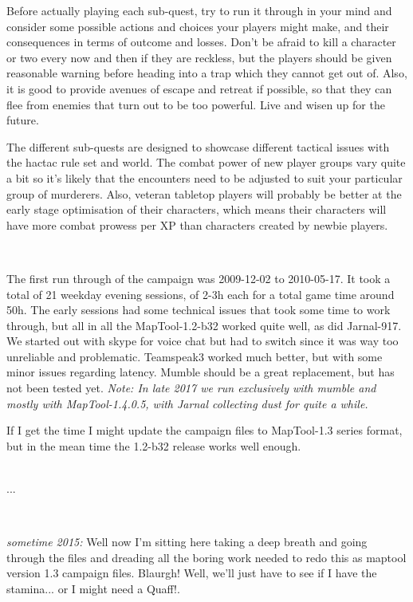 \documentclass[11pt, twoside, titlepage, a4paper]{report}
\begin{document}
Before actually playing each sub-quest, try to run it through in your mind and consider some possible actions and choices your players might make, and their consequences in terms of outcome and losses. Don't be afraid to kill a character or two every now and then if they are reckless, but the players should be given reasonable warning before heading into a trap which they cannot get out of. Also, it is good to provide avenues of escape and retreat if possible, so that they can flee from enemies that turn out to be too powerful. Live and wisen up for the future.

The different sub-quests are designed to showcase different tactical issues with the hactac rule set and world. The combat power of new player groups vary quite a bit so it's likely that the encounters need to be adjusted to suit your particular group of murderers. Also, veteran tabletop players will probably be better at the early stage optimisation of their characters, which means their characters will have more combat prowess per XP than characters created by newbie players.

\

The first run through of the campaign was 2009-12-02 to 2010-05-17. It took a total of 21 weekday evening sessions, of 2-3h each for a total game time around 50h. The early sessions had some technical issues that took some time to work through, but all in all the MapTool-1.2-b32 worked quite well, as did Jarnal-917. We started out with skype for voice chat but had to switch since it was way too unreliable and problematic. Teamspeak3 worked much better, but with some minor issues regarding latency. Mumble should be a great replacement, but has not been tested yet. \emph{Note: In late 2017 we run exclusively with mumble and mostly with MapTool-1.4.0.5, with Jarnal collecting dust for quite a while.}

If I get the time I might update the campaign files to MapTool-1.3 series format, but in the mean time the 1.2-b32 release works well enough.\\

\

...

\

\emph{sometime 2015:} Well now I'm sitting here taking a deep breath and going through the files and dreading all the boring work needed to redo this as maptool version 1.3 campaign files. Blaurgh! Well, we'll just have to see if I have the stamina... or I might need a Quaff!.

\
\end{document}
